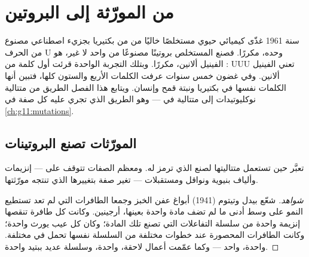\chapter{من المورّثة إلى البروتين}\label{ch:g11:gene-expression}

سنة 1961 غذّى كيميائي حيوي مستخلصًا خاليًا من  من بكتيريا
بجزيء  اصطناعي مصنوع من الحرف U وحده، مكررًا. فصنع المستخلص بروتينًا
مصنوعًا من  واحد لا غير، هو الفينيل ألانين، مكررًا. وبتلك
التجربة الواحدة قرئت أول كلمة من : UUU تعني الفينيل
ألانين. وفي غضون خمس سنوات عرفت الكلمات الأربع والستون كلها، فتبين
أنها الكلمات نفسها في بكتيريا ونبتة قمح وإنسان. ويتابع هذا الفصل
الطريق من متتالية نوكليوتيدات  إلى متتالية  في
 --- وهو الطريق الذي تجري عليه كل صفة في
\cref{ch:g11:mutations}.

\section{المورّثات تصنع البروتينات}

\begin{proposition}\label{prop:g11:gene-expression:onegene}
تعبَّر  حين تستعمل  متتاليتها لصنع  الذي ترمز
له. ومعظم الصفات تتوقف على  --- إنزيمات وألياف بنيوية ونواقل
ومستقبلات ---  تغير صفة بتغييرها  الذي تنتجه مورّثتها.
\end{proposition}
\begin{proof}[شواهد]
شعّع بيدل وتيتوم (1941) أبواغ عفن الخبز وجمعا الطافرات التي لم تعد
تستطيع النمو على وسط أدنى ما لم تضف مادة واحدة بعينها، 
أرجينين. وكانت كل طافرة تنقصها إنزيمة واحدة من سلسلة التفاعلات التي
تصنع تلك المادة؛ وكان كل عيب يورث  واحدة؛ وكانت الطافرات
المحصورة عند خطوات مختلفة من السلسلة نفسها تحمل  في 
مختلفة.  واحدة،  واحد --- وكما عمّمت أعمال لاحقة، 
واحدة، وسلسلة عديد ببتيد واحدة.
\end{proof}

